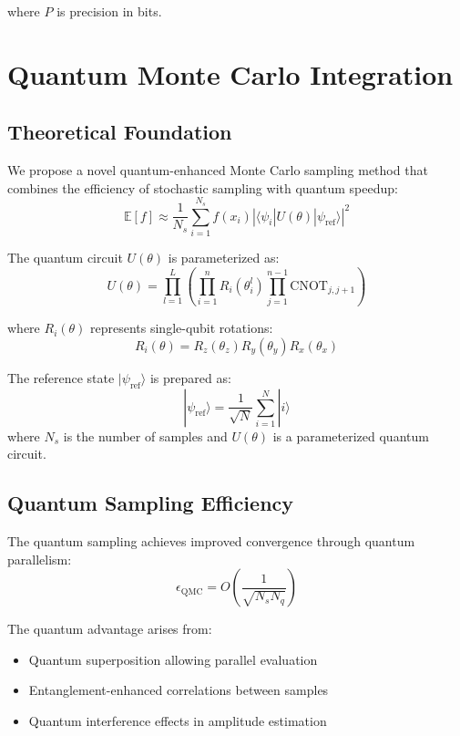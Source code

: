 \documentclass{article}
\begin{document}
where $P$ is precision in bits.

\section{Quantum Monte Carlo Integration}
\subsection{Theoretical Foundation}
We propose a novel quantum-enhanced Monte Carlo sampling method that combines the efficiency of stochastic sampling with quantum speedup:
\begin{equation}
\mathbb{E}[f] \approx \frac{1}{N_s} \sum_{i=1}^{N_s} f(x_i) |\langle \psi_i|U(\theta)|\psi_{\text{ref}}\rangle|^2
\end{equation}

The quantum circuit $U(\theta)$ is parameterized as:
\begin{equation}
U(\theta) = \prod_{l=1}^L \left(\prod_{i=1}^n R_i(\theta_i^l) \prod_{j=1}^{n-1} \text{CNOT}_{j,j+1}\right)
\end{equation}

where $R_i(\theta)$ represents single-qubit rotations:
\begin{equation}
R_i(\theta) = R_z(\theta_z)R_y(\theta_y)R_x(\theta_x)
\end{equation}

The reference state $|\psi_{\text{ref}}\rangle$ is prepared as:
\begin{equation}
|\psi_{\text{ref}}\rangle = \frac{1}{\sqrt{N}} \sum_{i=1}^N |i\rangle
\end{equation}
where $N_s$ is the number of samples and $U(\theta)$ is a parameterized quantum circuit.

\subsection{Quantum Sampling Efficiency}
The quantum sampling achieves improved convergence through quantum parallelism:
\begin{equation}
\epsilon_{\text{QMC}} = O\left(\frac{1}{\sqrt{N_s N_q}}\right)
\end{equation}

The quantum advantage arises from:
\begin{itemize}
\item Quantum superposition allowing parallel evaluation
\item Entanglement-enhanced correlations between samples
\item Quantum interference effects in amplitude estimation
\end{itemize}
\end{document}
